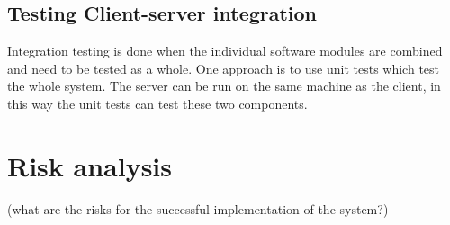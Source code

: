 \documentclass[a4paper]{article}
\begin{document}



\subsection{Testing Client-server integration}
Integration testing is done when the individual software modules are combined and need to be tested as a whole. One approach is to use unit tests which test the whole system. The server can be run on the same machine as the client, in this way the unit tests can test these two components.

\section{Risk analysis}
(what are the risks for the successful implementation of the system?)
\end{document}
